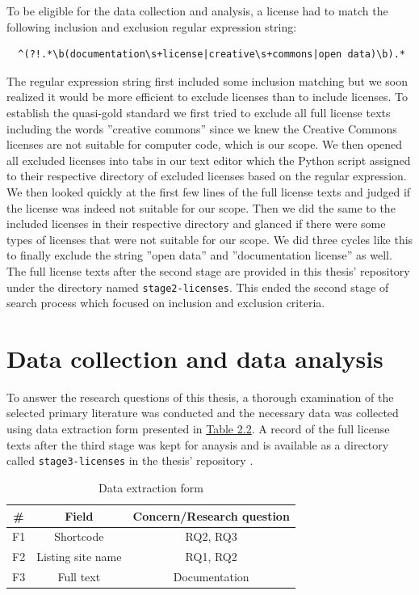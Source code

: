 To be eligible for the data collection and analysis, a license had to match the following inclusion and exclusion regular expression string:
\begin{verbatim}
  ^(?!.*\b(documentation\s+license|creative\s+commons|open data)\b).*
\end{verbatim}

The regular expression string first included some inclusion matching but we soon realized it would be more efficient to exclude licenses than to include licenses. To establish the quasi-gold standard we first tried to exclude all full license texts including the words ''creative commons'' since we knew the Creative Commons licenses are not suitable for computer code, which is our scope. We then opened all excluded licenses into tabs in our text editor which the Python script assigned to their respective directory of excluded licenses based on the regular expression. We then looked quickly at the first few lines of the full license texts and judged if the license was indeed not suitable for our scope. Then we did the same to the included licenses in their respective directory and glanced if there were some types of licenses that were not suitable for our scope. We did three cycles like this to finally exclude the string ''open data'' and ''documentation license'' as well. The full license texts after the second stage are provided in this thesis' repository \citep{mscthesis} under the directory named \texttt{stage2-licenses}. This ended the second stage of search process which focused on inclusion and exclusion criteria.

\section{Data collection and data analysis}
To answer the research questions of this thesis, a thorough examination of the selected primary literature was conducted and the necessary data was collected using data extraction form presented in \hyperref[table:extraction]{Table 2.2}. A record of the full license texts after the third stage was kept for anaysis and is available as a directory called \texttt{stage3-licenses} in the thesis' repository \citep{mscthesis}.

\begin{table}[t]
	\begin{center}
		\begin{tabular}{||c c c||} 
			\hline
			\# & Field & Concern/Research question \\
			\hline
			F1 & Shortcode & RQ2, RQ3 \\
			F2 & Listing site name & RQ1, RQ2 \\
			F3 & Full text &  Documentation\\
			\hline
		\end{tabular}
		\caption{Data extraction form}
		\label{table:extraction}
	\end{center}
\end{table}

